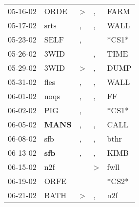 \begin{supertabular}{p{0.07\textwidth}p{0.06\textwidth}p{0.02\textwidth}p{0.02\textwidth}p{0.06\textwidth}}
          05-16-02\textsuperscript{} &           ORDE\textsuperscript{} &     \textgreater &                , &           FARM\textsuperscript{} \\
          05-17-02\textsuperscript{} &           srts\textsuperscript{} &                , &                , &           WALL\textsuperscript{} \\
          05-23-02\textsuperscript{} &           SELF\textsuperscript{} &                , &                  &                            *CS1* \\
          05-26-02\textsuperscript{} &           3WID\textsuperscript{} &                  &                , &           TIME\textsuperscript{} \\
          05-29-02\textsuperscript{} &           3WID\textsuperscript{} &     \textgreater &                , &           DUMP\textsuperscript{} \\
          05-31-02\textsuperscript{} &           fles\textsuperscript{} &                , &                , &           WALL\textsuperscript{} \\
          06-01-02\textsuperscript{} &           noqs\textsuperscript{} &                , &                , &             FF\textsuperscript{} \\
          06-02-02\textsuperscript{} &            PIG\textsuperscript{} &                , &                  &                            *CS1* \\
          06-05-02\textsuperscript{} &  \textbf{MANS\textsuperscript{}} &                , &                , &           CALL\textsuperscript{} \\
          06-08-02\textsuperscript{} &            sfb\textsuperscript{} &                , &                , &           bthr\textsuperscript{} \\
          06-13-02\textsuperscript{} &   \textbf{sfb\textsuperscript{}} &                , &                , &           KIMB\textsuperscript{} \\
          06-15-02\textsuperscript{} &            n2f\textsuperscript{} &                  &     \textgreater &           fwll\textsuperscript{} \\
          06-19-02\textsuperscript{} &           ORFE\textsuperscript{} &                  &                  &                            *CS2* \\
          06-21-02\textsuperscript{} &           BATH\textsuperscript{} &     \textgreater &                , &            n2f\textsuperscript{} \\

\end{supertabular}
